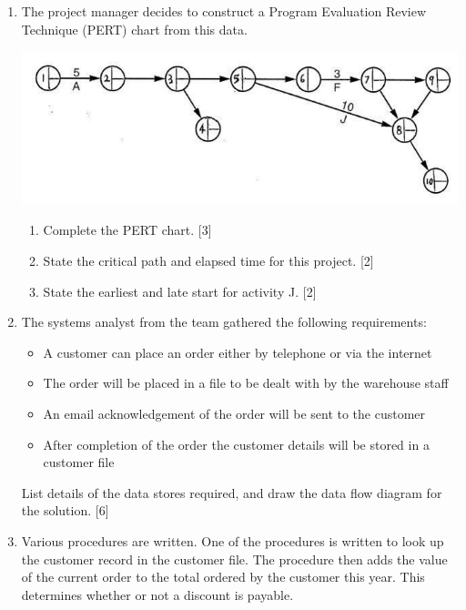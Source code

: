 \begin{enumerate}
\item The project manager decides to construct a Program Evaluation Review
Technique (PERT) chart from this data.
\begin{center}
\includegraphics[width=0.5\paperwidth]{static/img/9597-HCI-2018-P2-Q6}
\par\end{center}
\begin{enumerate}
\item Complete the PERT chart. \hfill{}{[}3{]}
\item State the critical path and elapsed time for this project. \hfill{}{[}2{]}
\item State the earliest and late start for activity J. \hfill{}{[}2{]}
\end{enumerate}
\item The systems analyst from the team gathered the following requirements: 
\begin{itemize}
\item A customer can place an order either by telephone or via the internet
\item The order will be placed in a file to be dealt with by the warehouse
staff 
\item An email acknowledgement of the order will be sent to the customer 
\item After completion of the order the customer details will be stored
in a customer file 
\end{itemize}
List details of the data stores required, and draw the data flow diagram
for the solution.\hfill{} {[}6{]}
\item Various procedures are written. One of the procedures is written to
look up the customer record in the customer file. The procedure then
adds the value of the current order to the total ordered by the customer
this year. This determines whether or not a discount is payable. 


\end{enumerate}
